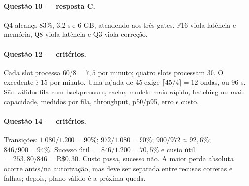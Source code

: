 \paragraph{Questão 10 — resposta C.} Q4 alcança 83\%, 3,2 s e 6 GB, atendendo aos três gates. F16 viola latência e memória, Q8 viola latência e Q3 viola correção.

\paragraph{Questão 12 — critérios.} Cada slot processa $60/8=7{,}5$ por minuto; quatro slots processam 30. O excedente é 15 por minuto. Uma rajada de 45 exige $\lceil45/4\rceil=12$ ondas, ou 96 s. São válidos fila com backpressure, cache, modelo mais rápido, batching ou mais capacidade, medidos por fila, throughput, p50/p95, erro e custo.

\paragraph{Questão 14 — critérios.} Transições: $1.080/1.200=90\%$; $972/1.080=90\%$; $900/972\approx92{,}6\%$; $846/900=94\%$. Sucesso útil $=846/1.200=70{,}5\%$ e custo útil $=253{,}80/846=\mathrm{R\$}0{,}30$. Custo passa, sucesso não. A maior perda absoluta ocorre antes/na autorização, mas deve ser separada entre recusas corretas e falhas; depois, plano válido é a próxima queda.

